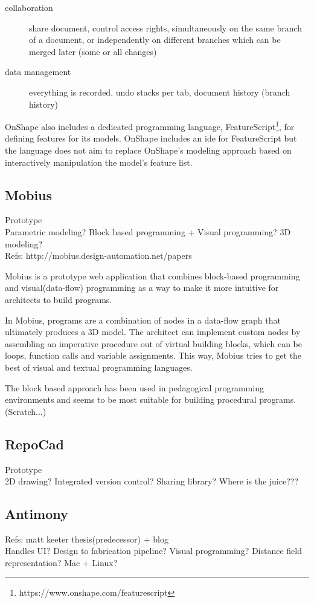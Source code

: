 \begin{description}
	\item[collaboration] share document, control access rights, simultaneously on the same branch of a document, or independently on different branches which can be merged later (some or all changes)
	\item[data management] everything is recorded, undo stacks per tab, document history (branch history)
\end{description}

OnShape also includes a dedicated programming language, FeatureScript\footnote{https://www.onshape.com/featurescript}, for defining features for its models.
OnShape includes an \gls{ide} for FeatureScript but the language does not aim to replace OnShape's modeling approach based on interactively manipulation the model's feature list.


\subsection{Mobius}
Prototype\\
Parametric modeling? Block based programming + Visual programming? 3D modeling?\\
Refs: http://mobius.design-automation.net/papers

Mobius is a prototype web application that combines block-based programming and visual(data-flow) programming as a way to make it more intuitive for architects to build programs.

In Mobius, programs are a combination of nodes in a data-flow graph that ultimately produces a 3D model.
The architect can implement custom nodes by assembling an imperative procedure out of virtual building blocks, which can be loops, function calls and variable assignments.
This way, Mobius tries to get the best of visual and textual programming languages.

The block based approach has been used in pedagogical programming environments and seems to be most suitable for building procedural programs.(Scratch...)


\subsection{RepoCad}
Prototype\\
2D drawing? Integrated version control? Sharing library?
Where is the juice???


\subsection{Antimony}
Refs: matt keeter thesis(predecessor) + blog\\
Handles UI? Design to fabrication pipeline? Visual programming? Distance field representation? Mac + Linux?

